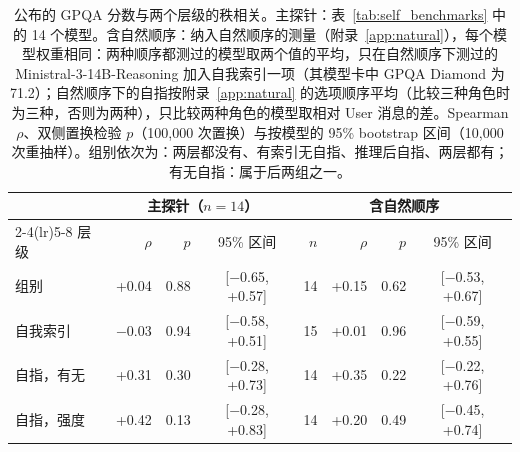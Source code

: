 \begin{table}[htbp]
\vspace{1.2em}
\caption{公布的 GPQA 分数与两个层级的秩相关。主探针：表~\ref{tab:self_benchmarks} 中的 14 个模型。含自然顺序：纳入自然顺序的测量（附录~\ref{app:natural}），每个模型权重相同：两种顺序都测过的模型取两个值的平均，只在自然顺序下测过的 Ministral-3-14B-Reasoning 加入自我索引一项（其模型卡中 GPQA Diamond 为 71.2）；自然顺序下的自指按附录~\ref{app:natural} 的选项顺序平均（比较三种角色时为三种，否则为两种），只比较两种角色的模型取相对 User 消息的差。Spearman $\rho$、双侧置换检验 $p$（100,000 次置换）与按模型的 95\% bootstrap 区间（10,000 次重抽样）。组别依次为：两层都没有、有索引无自指、推理后自指、两层都有；有无自指：属于后两组之一。}
\label{tab:self_benchmark_corr}
{\footnotesize
\setlength{\tabcolsep}{4pt}
\begin{tabular}{lrrcrrrc}
\toprule
& \multicolumn{3}{c}{主探针（$n = 14$）} & \multicolumn{4}{c}{含自然顺序} \\
\cmidrule(lr){2-4}\cmidrule(lr){5-8}
层级 & $\rho$ & $p$ & 95\% 区间 & $n$ & $\rho$ & $p$ & 95\% 区间 \\
\midrule
组别 & +0.04 & 0.88 & [$-$0.65, +0.57] & 14 & +0.15 & 0.62 & [$-$0.53, +0.67] \\
自我索引 & $-$0.03 & 0.94 & [$-$0.58, +0.51] & 15 & +0.01 & 0.96 & [$-$0.59, +0.55] \\
自指，有无 & +0.31 & 0.30 & [$-$0.28, +0.73] & 14 & +0.35 & 0.22 & [$-$0.22, +0.76] \\
自指，强度 & +0.42 & 0.13 & [$-$0.28, +0.83] & 14 & +0.20 & 0.49 & [$-$0.45, +0.74] \\
\bottomrule
\end{tabular}}
\end{table}
